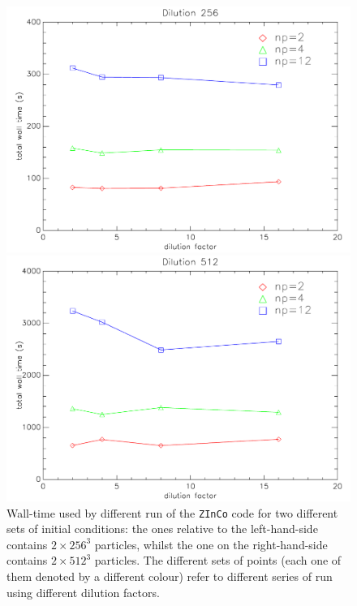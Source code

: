 \documentclass[11pt,a4paper,titlepage]{article}
\newcommand{\zinco}{\texttt{ZInCo}\xspace}
\begin{document}
\begin{figure}[!tb]
\begin{minipage}{0.45\textwidth}
\includegraphics[width=\textwidth]{benchmark_wtaVSdil_256_zoom.pdf}
\end{minipage}
\begin{minipage}{0.45\textwidth}
\begin{flushright}
\includegraphics[width=\textwidth]{benchmark_wtaVSdil_512_zoom.pdf}
\end{flushright}
\end{minipage}
\caption{Wall-time used by different run of the \zinco code for two different sets of initial conditions: the ones relative to the left-hand-side contains $2 \times 256^3$ particles, whilst the one on the right-hand-side contains $2 \times 512^3$ particles. The different sets of points (each one of them denoted by a different colour) refer to different series of run using different dilution factors.}
\label{benchmark_wtaVSdil_zoom}
\end{figure}
\end{document}
